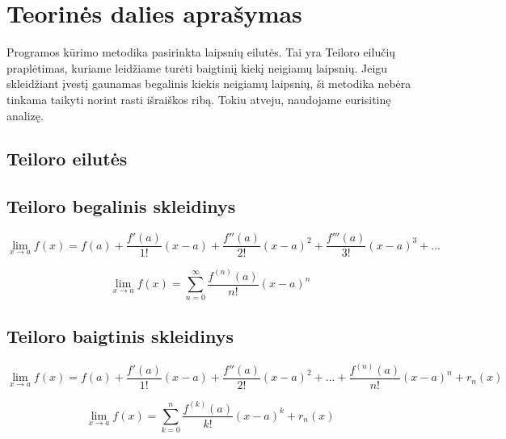 \section{Teorinės dalies aprašymas}















Programos kūrimo metodika pasirinkta laipsnių eilutės. 
Tai yra Teiloro eilučių praplėtimas, kuriame leidžiame turėti baigtiniį kiekį neigiamų laipsnių. 
Jeigu skleidžiant įvestį gaunamas begalinis kiekis neigiamų laipsnių, ši metodika nebėra tinkama taikyti norint rasti išraiškos ribą.
Tokiu atveju, naudojame eurisitinę analizę. 

\subsection{Teiloro eilutės}
	
	\subsection*{Teiloro begalinis skleidinys}

\[\lim_{x \to a} f(x) = f(a) + \frac{f'(a)}{1!}(x-a)+\frac{f''(a)}{2!}(x-a)^2 + \frac{f'''(a)}{3!}(x-a)^3 + ...\]

\[\lim_{x \to a} f(x) = \sum_{n=0}^{\infty} \frac{f^{(n)}(a)}{n!}(x-a)^n\]

\subsection*{Teiloro baigtinis skleidinys}

\[\lim_{x \to a} f(x) = f(a) + \frac{f'(a)}{1!}(x-a)+\frac{f''(a)}{2!}(x-a)^2 + ... + \frac{f^{(n)}(a)}{n!}(x-a)^n + r_n(x) \]

\[\lim_{x \to a} f(x) = \sum_{k=0}^{n} \frac{f^{(k)}(a)}{k!}(x-a)^k + r_n(x)\]

